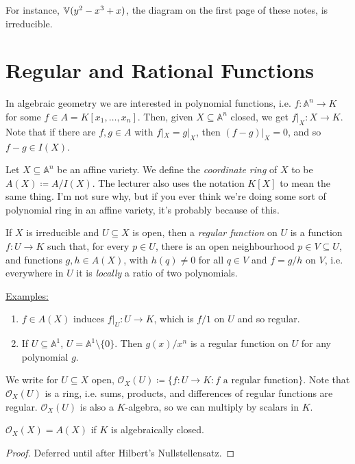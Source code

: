 \documentclass[10pt,a4paper,rgb]{article}
\begin{document}
For instance, $\mathbb{V}(y^2-x^3+x)$, the diagram on the first page of these notes, is irreducible.

\section{Regular and Rational Functions}
In algebraic geometry we are interested in polynomial functions, i.e. $f: \mathbb{A}^n \to K$ for some $f \in A = K[x_1, \ldots, x_n]$. Then, given $X \subseteq \mathbb{A}^n$ closed, we get $f|_X : X \to K$. Note that if there are $f,g \in A$ with $f|_X = g|_X$, then $(f-g)|_X = 0$, and so $f-g \in I(X)$.

Let $X \subseteq \mathbb{A}^n$ be an affine variety. We define the \emph{coordinate ring} of $X$ to be $A(X) \coloneqq A/I(X)$. The lecturer also uses the notation $K[X]$ to mean the same thing. I'm not sure why, but if you ever think we're doing some sort of polynomial ring in an affine variety, it's probably  because of this.

If $X$ is irreducible and $U \subseteq X$ is open, then a \emph{regular function} on $U$ is a function $f:U \to K$ such that, for every $p \in U$, there is an open neighbourhood $p \in V \subseteq U$, and functions $g, h \in A(X)$, with $h(q) \neq 0$ for all $q \in V$ and $f = g/h$ on $V$, i.e. everywhere in $U$ it is \textit{locally} a ratio of two polynomials.

\hspace*{-1em}\underline{Examples:}
\begin{enumerate}
\item $f \in A(X)$ induces $f|_U: U \to K$, which is $f/1$ on $U$ and so regular.
\item If $U \subseteq \mathbb{A}^1$, $U = \mathbb{A}^1 \setminus\{0\}$. Then $g(x)/x^n$ is a regular function on $U$ for any polynomial $g$.
\end{enumerate}

We write for $U \subseteq X$ open, $\mathcal{O}_X(U) \coloneqq \{f:U \to K: f\text{ a regular function}\}$. Note that $\mathcal{O}_X(U)$ is a ring, i.e. sums, products, and differences of regular functions are regular. $\mathcal{O}_X(U)$ is also a $K$-algebra, so we can multiply by scalars in $K$.

\begin{lemma}
$\mathcal{O}_X(X) = A(X)$ if $K$ is algebraically closed.
\end{lemma}
\begin{proof}
Deferred until after Hilbert's Nullstellensatz.
\end{proof}
\end{document}
